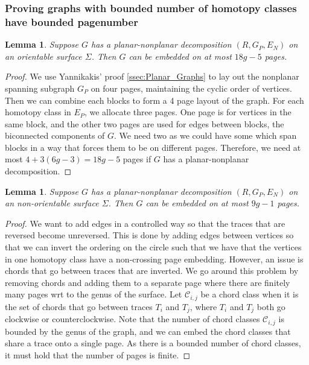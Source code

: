 \documentclass[]{report}
\newtheorem{lemma}[theorem]{Lemma}
\theoremstyle{definition}
\numberwithin{theorem}{section}
\numberwithin{equation}{section}
\begin{document}
\subsubsection{Proving graphs with bounded number of homotopy classes have bounded pagenumber}\label{sssec:bounded_pagenumber_homotopy}
\begin{lemma}\label{lem:planar_nonplanar_orientable}
	Suppose $G$ has a planar-nonplanar decomposition $(R, G_P, E_N)$ on an orientable surface $\Sigma$. Then $G$ can be embedded on at most $18g - 5$ pages.
\end{lemma}
\begin{proof}
	We use Yannikakis' proof \cref{ssec:Planar_Graphs} to lay out the nonplanar spanning subgraph $G_P$ on four pages, maintaining the cyclic order of vertices. Then we can combine each blocks to form a 4 page layout of the graph. For each homotopy class in $E_P$, we allocate three pages. One page is for vertices in the same block, and the other two pages are used for edges between blocks, the biconnected components of $G$. We need two as we could have some which span blocks in a way that forces them to be on different pages. Therefore, we need at most $4 + 3(6g - 3) = 18g-5$ pages if $G$ has a planar-nonplanar decomposition. 
\end{proof}

\begin{lemma}\label{lem:planar_nonplanar_nonorientable}
	Suppose $G$ has a planar-nonplanar decomposition $(R, G_P, E_N)$ on an non-orientable surface $\Sigma$. Then $G$ can be embedded on at most $9g - 1$ pages.
\end{lemma}
\begin{proof}
We want to add edges in a controlled way so that the traces that are reversed become unreversed. This is done by adding edges between vertices so that we can invert the ordering on the circle such that we have that the vertices in one homotopy class have a non-crossing page embedding. However, an issue is chords that go between traces that are inverted. We go around this problem by removing chords and adding them to a separate page where there are finitely many pages wrt to the genus of the surface. Let $\mathcal{C}_{i,j}$ be a chord class when it is the set of chords that go between traces $T_i$ and $T_j$, where $T_i$ and $T_j$ both go clockwise or counterclockwise. Note that the number of chord classes $\mathcal{C}_{i,j}$ is bounded by the genus of the graph, and we can embed the chord classes that share a trace onto a single page. As there is a bounded number of chord classes, it must hold that the number of pages is finite. 
\end{proof}
\end{document}
